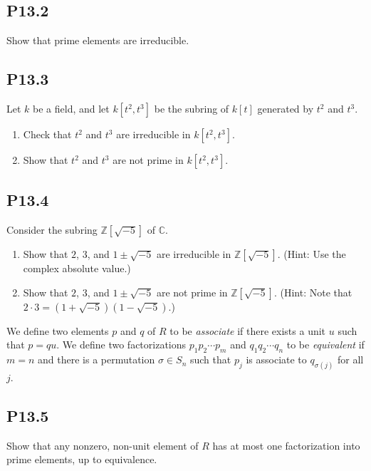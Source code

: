 \documentclass[lang=cn,11pt]{template}
\begin{document}
\subsection*{P13.2} Show that prime elements are irreducible.

\subsection*{P13.3} Let \( k \) be a field, and let \( k[t^2, t^3] \) be the subring of \( k[t] \) generated by \( t^2 \) and \( t^3 \).
\begin{enumerate}
    \item Check that \( t^2 \) and \( t^3 \) are irreducible in \( k[t^2, t^3] \).
    \item Show that \( t^2 \) and \( t^3 \) are not prime in \( k[t^2, t^3] \).
\end{enumerate}

\subsection*{P13.4} Consider the subring \( \mathbb{Z}[\sqrt{-5}] \) of \( \mathbb{C} \).
\begin{enumerate}
    \item Show that \( 2 \), \( 3 \), and \( 1 \pm \sqrt{-5} \) are irreducible in \( \mathbb{Z}[\sqrt{-5}] \). (Hint: Use the complex absolute value.)
    \item Show that \( 2 \), \( 3 \), and \( 1 \pm \sqrt{-5} \) are not prime in \( \mathbb{Z}[\sqrt{-5}] \). (Hint: Note that \( 2 \cdot 3 = (1 + \sqrt{-5})(1 - \sqrt{-5}) \).)
\end{enumerate}

\begin{definition}
We define two elements \( p \) and \( q \) of \( R \) to be \textit{associate} if there exists a unit \( u \) such that \( p = qu \). We define two factorizations \( p_1 p_2 \cdots p_m \) and \( q_1 q_2 \cdots q_n \) to be \textit{equivalent} if \( m = n \) and there is a permutation \( \sigma \in S_n \) such that \( p_j \) is associate to \( q_{\sigma(j)} \) for all \( j \).
\end{definition}

\subsection*{P13.5} Show that any nonzero, non-unit element of \( R \) has at most one factorization into prime elements, up to equivalence.
\end{document}
